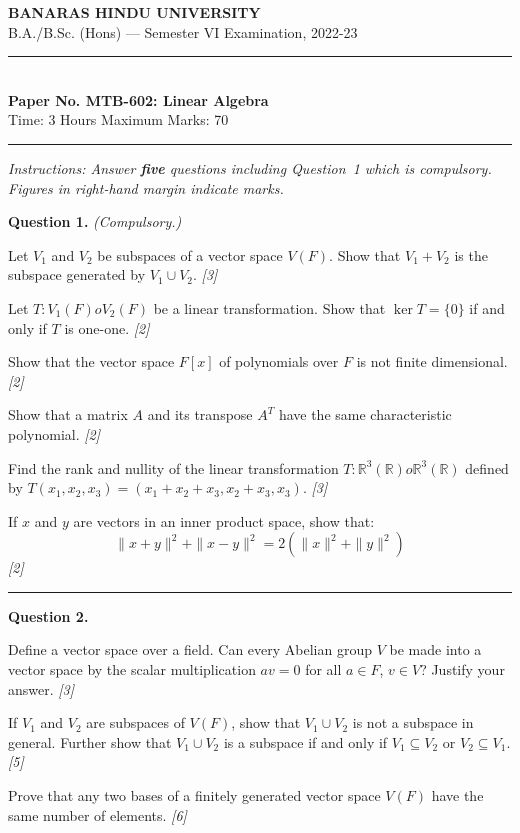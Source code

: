 \documentclass[11pt,a4paper]{article}
\newcommand{\pts}[1]{\hfill   \textit{[#1]}}
\begin{document}
\begin{center}
  {\large\bfseries BANARAS HINDU UNIVERSITY}\\[2pt]
  {\normalsize B.A./B.Sc. (Hons) --- Semester VI Examination, 2022-23}\\[6pt]
  \rule{0.8\linewidth}{0.5pt}\\[6pt]
  {\large\bfseries Paper No. MTB-602: Linear Algebra}\\[4pt]
  {\normalsize Time: 3 Hours \hfill Maximum Marks: 70}
\end{center}
\rule{\linewidth}{0.4pt}
\smallskip



\noindent   \textit{Instructions: Answer   \textbf{five} questions including Question~1 which is compulsory. Figures in right-hand margin indicate marks.}
\bigskip




\noindent   \textbf{Question 1.}   \textit{(Compulsory.)}

\begin{parts}
  \item Let $V_1$ and $V_2$ be subspaces of a vector space $V(F)$. Show that $V_1 + V_2$ is the subspace generated by $V_1 \cup V_2$. \pts{3}
  \item Let $T: V_1(F)  o V_2(F)$ be a linear transformation. Show that $\ker T = \{0\}$ if and only if $T$ is one-one. \pts{2}
  \item Show that the vector space $F[x]$ of polynomials over $F$ is not finite dimensional. \pts{2}
  \item Show that a matrix $A$ and its transpose $A^T$ have the same characteristic polynomial. \pts{2}
  \item Find the rank and nullity of the linear transformation $T: \mathbb{R}^3(\mathbb{R})  o \mathbb{R}^3(\mathbb{R})$ defined by $T(x_1, x_2, x_3) = (x_1 + x_2 + x_3, x_2 + x_3, x_3)$. \pts{3}
  \item If $x$ and $y$ are vectors in an inner product space, show that:
  \[
  \|x + y\|^2 + \|x - y\|^2 = 2(\|x\|^2 + \|y\|^2)
  \] \pts{2}
\end{parts}

\medskip\rule{\linewidth}{0.2pt}

\medskip


\noindent   \textbf{Question 2.}

\begin{parts}
  \item Define a vector space over a field. Can every Abelian group $V$ be made into a vector space by the scalar multiplication $av = 0$ for all $a \in F$, $v \in V$? Justify your answer. \pts{3}
  \item If $V_1$ and $V_2$ are subspaces of $V(F)$, show that $V_1 \cup V_2$ is not a subspace in general. Further show that $V_1 \cup V_2$ is a subspace if and only if $V_1 \subseteq V_2$ or $V_2 \subseteq V_1$. \pts{5}
  \item Prove that any two bases of a finitely generated vector space $V(F)$ have the same number of elements. \pts{6}
\end{parts}
\end{document}
